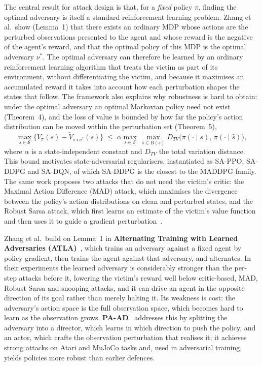 The central result for attack design is that, for a \emph{fixed} policy $\pi$, finding
the optimal adversary is itself a standard reinforcement learning problem. Zhang et al.\
show (Lemma~1) that there exists an ordinary MDP whose actions are the perturbed
observations presented to the agent and whose reward is the negative of the agent's
reward, and that the optimal policy of this MDP is the optimal adversary $\nu^*$. The
optimal adversary can therefore be learned by an ordinary reinforcement learning
algorithm that treats the victim as part of its environment, without differentiating
the victim, and because it maximises an accumulated reward it takes into account how
each perturbation shapes the states that follow. The framework also explains why
robustness is hard to obtain: under the optimal adversary an optimal Markovian policy
need not exist (Theorem~4), and the loss of value is bounded by how far the policy's
action distribution can be moved within the perturbation set (Theorem~5),
\begin{equation}
\max_{s \in \mathcal{S}} \bigl\{ V_\pi(s) - \tilde{V}_{\pi \circ \nu^*}(s) \bigr\}
\;\le\; \alpha \max_{s \in \mathcal{S}} \, \max_{\hat{s} \in B(s)}
D_{TV}\bigl(\pi(\cdot \mid s), \, \pi(\cdot \mid \hat{s})\bigr),
\label{eq:samdp_bound}
\end{equation}
where $\alpha$ is a state-independent constant and $D_{TV}$ the total variation
distance. This bound motivates state-adversarial regularisers, instantiated as SA-PPO,
SA-DDPG and SA-DQN, of which SA-DDPG is the closest to the MADDPG family. The same work
proposes two attacks that do not need the victim's critic: the Maximal Action Difference
(MAD) attack, which maximises the divergence between the policy's action distributions
on clean and perturbed states, and the Robust Sarsa attack, which first learns an
estimate of the victim's value function and then uses it to guide a gradient
perturbation~\cite{zhang2020robust}.

Zhang et al.\ build on Lemma~1 in \textbf{Alternating Training with Learned
Adversaries (ATLA)}~\cite{zhang2021robust}, which trains an adversary against a fixed
agent by policy gradient, then trains the agent against that adversary, and alternates.
In their experiments the learned adversary is considerably stronger than the per-step
attacks before it, lowering the victim's reward well below critic-based, MAD, Robust
Sarsa and snooping attacks, and it can drive an agent in the opposite direction of its goal rather than
merely halting it. Its weakness is cost: the adversary's action space is the full
observation space, which becomes hard to learn as the observation grows.
\textbf{PA-AD}~\cite{sun2021strongest} addresses this by splitting the adversary into a
director, which learns in which direction to push the policy, and an actor, which crafts
the observation perturbation that realises it; it achieves strong attacks on Atari and
MuJoCo tasks and, used in adversarial training, yields policies more robust than earlier
defences.

